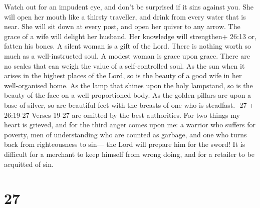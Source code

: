 Watch out for an impudent eye, and don't be surprised if it sins against
you.  She will open her mouth like a thirsty traveller, and
drink from every water that is near. She will sit down at every post,
and open her quiver to any arrow.  The grace of a wife will
delight her husband. Her knowledge will strengthen+ 26:13 or, fatten his
bones.  A silent woman is a gift of the Lord. There is
nothing worth so much as a well-instructed soul.  A modest
woman is grace upon grace. There are no scales that can weigh the value
of a self-controlled soul.  As the sun when it arises in
the highest places of the Lord, so is the beauty of a good wife in her
well-organised home.  As the lamp that shines upon the holy
lampstand, so is the beauty of the face on a well-proportioned body.
 As the golden pillars are upon a base of silver, so are
beautiful feet with the breasts of one who is steadfast.
-27 + 26:19-27 Verses 19-27 are omitted by the best
authorities.  For two things my heart is grieved, and for
the third anger comes upon me: a warrior who suffers for poverty, men of
understanding who are counted as garbage, and one who turns back from
righteousness to sin--- the Lord will prepare him for the sword!
 It is difficult for a merchant to keep himself from wrong
doing, and for a retailer to be acquitted of sin.

\hypertarget{section-7}{%
\section{27}\label{section-7}}

